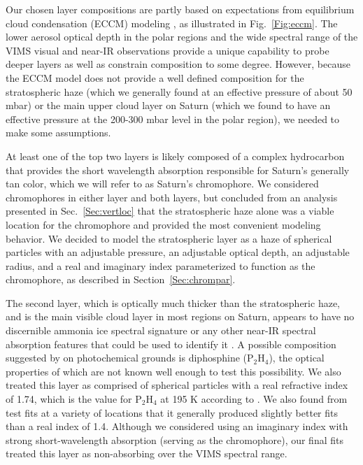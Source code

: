 \documentclass[article,11pt]{emulateapj}
\def\pthf{P$_2$H$_4$ }
\def\pthfx{P$_2$H$_4$}
\begin{document}
Our chosen layer compositions are partly based on expectations from
equilibrium cloud condensation (ECCM) modeling
\citep{Weidenschilling1973,Atreya2005SSR}, as illustrated in
Fig.\ \ref{Fig:eccm}.  The lower aerosol optical depth in the polar
regions and the wide spectral range of the VIMS visual and near-IR
observations provide a unique capability to probe deeper layers as
well as constrain composition to some degree. However, because the
ECCM model does not provide a well defined composition for the
stratospheric haze (which we generally found at an effective
pressure of about 50 mbar) or the main upper cloud layer on Saturn (which we
found to have an effective pressure at the 200-300 mbar level in the polar region), we
needed to make some assumptions.

At least one of the top two layers is likely composed of a complex
hydrocarbon that provides the short wavelength absorption responsible
for Saturn's generally tan color, which we will refer to as Saturn's
chromophore.   We considered chromophores in either layer
and both layers, but concluded from an analysis presented
in Sec.\ \ref{Sec:vertloc} that the stratospheric haze alone was a
viable location for the chromophore and provided the most convenient
modeling behavior.  We decided to model the stratospheric layer
as a haze of spherical particles with an adjustable 
pressure, an adjustable optical depth, an adjustable radius, and a
real and imaginary index parameterized to function as the chromophore,
 as described in Section\ \ref{Sec:chrompar}.


The second layer, which is optically much thicker than
the stratospheric haze, and is the main visible cloud layer in most
regions on Saturn, appears to have no discernible ammonia
ice spectral signature \citep{Kerola1997} or any other near-IR spectral absorption
features that could be used to identify it \citep{Sro2013gws}. A possible composition
suggested by \cite{Fouchet2009} on photochemical grounds is
diphosphine (\pthfx), the optical properties of which are not known
well enough to test this possibility.  We also treated this layer as
comprised of spherical particles with a real refractive index of 1.74,
which is the value for \pthf at 195 K according to
\cite{Wohlfarth2008}.   We also found from test fits at a variety of locations that it generally
 produced slightly better fits than a real index of 1.4.   Although we considered using an imaginary index
with strong short-wavelength absorption (serving as the chromophore), our
final fits treated this layer as non-absorbing over the VIMS spectral range.
\end{document}
